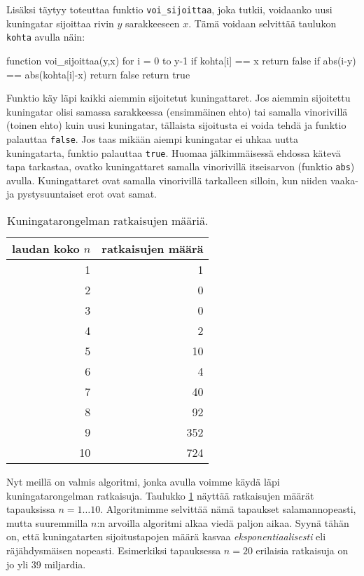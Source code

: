 Lisäksi täytyy toteuttaa funktio \texttt{voi\_sijoittaa},
joka tutkii, voidaanko uusi kuningatar sijoittaa
rivin $y$ sarakkeeseen $x$.
Tämä voidaan selvittää taulukon \texttt{kohta} avulla näin:

\begin{code}
function voi_sijoittaa(y,x)
    for i = 0 to y-1
        if kohta[i] == x
            return false
        if abs(i-y) == abs(kohta[i]-x)
            return false
    return true
\end{code}

Funktio käy läpi kaikki aiemmin sijoitetut kuningattaret.
Jos aiemmin sijoitettu kuningatar olisi samassa sarakkeessa
(ensimmäinen ehto) tai samalla vinorivillä (toinen ehto)
kuin uusi kuningatar, tällaista sijoitusta ei voida tehdä
ja funktio palauttaa \texttt{false}.
Jos taas mikään aiempi kuningatar ei uhkaa uutta kuningatarta,
funktio palauttaa \texttt{true}.
Huomaa jälkimmäisessä ehdossa kätevä tapa tarkastaa,
ovatko kuningattaret samalla vinorivillä itseis\-arvon
(funktio \texttt{abs}) avulla.
Kuningattaret ovat samalla vinorivillä tarkalleen silloin,
kun niiden vaaka- ja pystysuuntaiset erot ovat samat.

\begin{table}
\center
\begin{tabular}{rr}
laudan koko $n$ & ratkaisujen määrä \\
\hline
1 & 1 \\
2 & 0 \\
3 & 0 \\
4 & 2 \\
5 & 10 \\
6 & 4 \\
7 & 40 \\
8 & 92 \\
9 & 352 \\
10 & 724 \\
\end{tabular}
\caption{Kuningatarongelman ratkaisujen määriä.}
\label{tab:kuning}
\end{table}

Nyt meillä on valmis algoritmi, jonka avulla voimme
käydä läpi kuningatarongelman ratkaisuja.
Taulukko \ref{tab:kuning} näyttää ratkaisujen määrät
tapauksissa $n=1 \dots 10$.
Algoritmimme selvittää nämä tapaukset salamannopeasti,
mutta suuremmilla $n$:n arvoilla algoritmi alkaa viedä paljon aikaa.
Syynä tähän on, että kuningatarten sijoitustapojen
määrä kasvaa \emph{eksponentiaalisesti}
eli räjähdysmäisen nopeasti.
Esimerkiksi tapauksessa $n=20$ erilaisia ratkaisuja on jo yli 39 miljardia.

